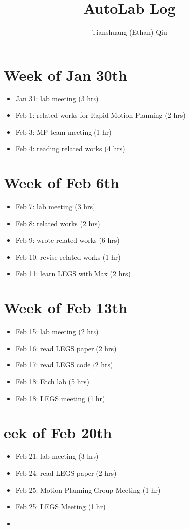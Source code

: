 \documentclass[12pt]{article}
\author{Tianshuang (Ethan) Qiu}
\begin{document}
\title{AutoLab Log}
\maketitle

\section{Week of Jan 30th}
\begin{itemize}
    \item Jan 31: lab meeting (3 hrs)
    \item Feb 1: related works for Rapid Motion Planning (2 hrs)
    \item Feb 3: MP team meeting (1 hr)
    \item Feb 4: reading related works (4 hrs)
\end{itemize}


\section{Week of Feb 6th}
\begin{itemize}
    \item Feb 7: lab meeting (3 hrs)
    \item Feb 8: related works (2 hrs)
    \item Feb 9: wrote related works (6 hrs)
    \item Feb 10: revise related works (1 hr)
    \item Feb 11: learn LEGS with Max (2 hrs)
\end{itemize}


\section{Week of Feb 13th}
\begin{itemize}
    \item Feb 15: lab meeting (2 hrs)
    \item Feb 16: read LEGS paper (2 hrs)
    \item Feb 17: read LEGS code (2 hrs)
    \item Feb 18: Etch lab (5 hrs)
    \item Feb 18: LEGS meeting (1 hr)
\end{itemize}

\section{eek of Feb 20th}
\begin{itemize}
    \item Feb 21: lab meeting (3 hrs)
    \item Feb 24: read LEGS paper (2 hrs)
    \item Feb 25: Motion Planning Group Meeting (1 hr)
    \item Feb 25: LEGS Meeting (1 hr)
    \item 
\end{itemize}
\end{document}
